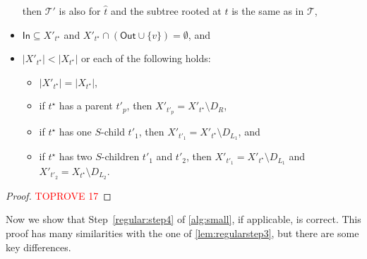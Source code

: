 \documentclass[a4paper,UKenglish,cleveref, autoref, thm-restate, numberwithinsect]{lipics-v2021}
\newcommand{\topheavy}{\text{top-heavy}\xspace}
\newcommand{\In}{\mathsf{In}}
\newcommand{\Out}{\mathsf{Out}}
\begin{document}
\begin{lemma}
\begin{itemize}
then $\mathcal{T}'$ is also \topheavy for $\hat{t}$ and the subtree rooted at $\hat{t}$ is the same as in $\mathcal{T}$,
\item $\In\subseteq X'_{t^{\star}}$ and $X'_{t^{\star}}\cap (\Out\cup\{v\})=\emptyset$, and
\item $|X'_{t^{\star}}|<|X_{t^{\star}}|$ or each of the following holds:
\begin{itemize}
    \item $|X'_{t^{\star}}|=|X_{t^{\star}}|$,
    \item if $t^{\star}$ has a parent $t'_p$, then $X'_{t'_p}=X'_{t^{\star}}\setminus D_R$, 
    \item if $t^{\star}$ has one $S$-child $t'_1$, then $X'_{t'_1}=X'_{t^{\star}}\setminus D_{L_1}$, and 
    \item if $t^{\star}$ has two $S$-children $t'_1$ and $t'_2$, then $X'_{t'_1}=X'_{t^{\star}}\setminus D_{L_1}$ and $X'_{t'_2}=X_{t^{\star}}\setminus D_{L_2}$.
\end{itemize}
\end{itemize}
\end{lemma}
\begin{proof}\textcolor{red}{TOPROVE 17}\end{proof}

Now we show that Step~\ref{regular:step4} of \cref{alg:small}, if applicable, is correct. This proof has many similarities with the one of \cref{lem:regularstep3}, but there are some key differences.
\end{document}
